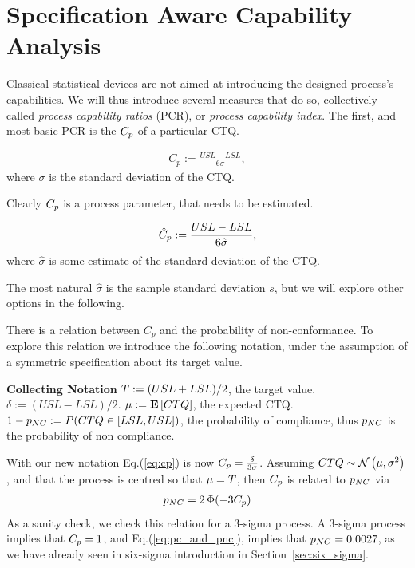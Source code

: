 \section{Specification Aware Capability Analysis}
Classical statistical devices are not aimed at introducing the designed process's capabilities.
We will thus introduce several measures that do so, collectively called \emph{process capability ratios} (PCR), or \emph{process capability index}.
The first, and most basic PCR is the $\cp$ of a particular CTQ.

\begin{definition}[$\cp$]
\begin{align}
\label{eq:cp}
	C_p:= \frac{USL-LSL}{6 \sigma}, 
\end{align}
where $\sigma$ is the standard deviation of the CTQ.

\end{definition}
Clearly $\cp$ is a process parameter, that needs to be estimated.
\begin{definition}[$\cpHat$]
\begin{align}
	\hat{C}_p:= \frac{USL-LSL}{6 \hat{\sigma}}, 
\end{align}
where $\hat{\sigma}$ is some estimate of the standard deviation of the CTQ.
\end{definition}
The most natural $\hat{\sigma}$ is the sample standard deviation $s$, but we will explore other options in the following.


There is a relation between $C_p$ and the probability of non-conformance. 
To explore this relation we introduce the following notation, under the assumption of a symmetric specification about its target value.
\begin{tcolorbox}
\footnotesize
\textbf{Collecting Notation} \newline
$T:= (USL+LSL)/2$, the target value. \newline
$\delta:= (USL-LSL)/2$.  \newline
$\mu:= \mathbf{E}\left[ CTQ \right]$, the expected CTQ. \newline
$1-p_{NC}:= P(CTQ \in [LSL,USL])$, the probability of compliance, thus $p_{NC}$ is the probability of non compliance. 
\end{tcolorbox}

With our new notation Eq.(\ref{eq:cp}) is now $C_p=\frac{\delta}{3 \sigma}$.
Assuming $CTQ \sim \mathcal{N}\left(\mu, \sigma^2\right)$, and that the process is centred so that $\mu=T$, then $\cp$ is related to $p_{NC}$ via
\begin{align}
\label{eq:pc_and_pnc}
 p_{NC}= 2\, \Phi(-3 C_p)
\end{align}
As a sanity check, we check this relation for a 3-sigma process.
A 3-sigma process implies that $C_p=1$, and Eq.(\ref{eq:pc_and_pnc}), implies that $p_{NC}=0.0027$, as we have already seen in six-sigma introduction in Section~\ref{sec:six_sigma}.

